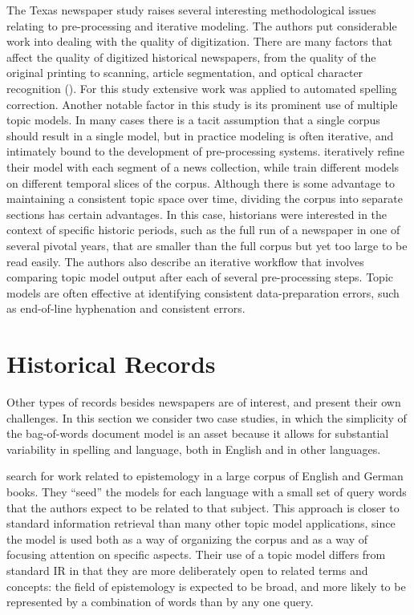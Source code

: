 The Texas newspaper study raises several interesting methodological issues relating to pre-processing and iterative modeling.
The authors put considerable work into dealing with the quality of digitization.
There are many factors that affect the quality of digitized historical newspapers, from the quality of the original printing to scanning, article segmentation, and optical character recognition ().
For this study extensive work was applied to automated spelling correction.
Another notable factor in this study is its prominent use of multiple topic models.
In many cases there is a tacit assumption that a single corpus should result in a single model, but in practice modeling is often iterative, and intimately bound to the development of pre-processing systems.
\citet{alsumait-08} iteratively refine their model with each segment of a news collection, while
\citet{yang-11-historical} train different models on different temporal slices of the corpus.
Although there is some advantage to maintaining a consistent topic space over time, dividing the corpus into separate sections has certain advantages.
In this case, historians were interested in the context of specific historic periods, such as the full run of a newspaper in one of several pivotal years, that are smaller than the full corpus but yet too large to be read easily.
The authors also describe an iterative workflow that involves comparing topic model output after each of several pre-processing steps.
Topic models are often effective at identifying consistent data-preparation errors, such as end-of-line hyphenation and consistent  errors.

\section{Historical Records}

Other types of records besides newspapers are of interest, and present their own challenges.
In this section we consider two case studies, in which the simplicity of the bag-of-words document model is an asset because it allows for substantial variability in spelling and language, both in English and in other languages.

\citet{erlin2017topic} search for work related to epistemology in a large corpus of English and German books.
They ``seed'' the models for each language with a small set of query words that the authors expect to be related to that subject.
This approach is closer to standard information retrieval than many other topic model applications, since the model is used both as a way of organizing the corpus and as a way of focusing attention on specific aspects.
Their use of a topic model differs from standard IR in that they are more deliberately open to related terms and concepts: the field of epistemology is expected to be broad, and more likely to be represented by a combination of words than by any one query.

